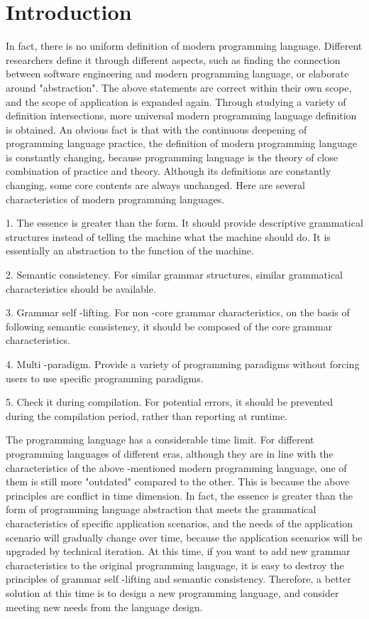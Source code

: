 \section{Introduction}
In fact, there is no uniform definition of modern programming language.
Different researchers define it through different aspects, such as finding
the connection between software engineering and modern programming language,
or elaborate around "abstraction".
The above statements are correct within their own scope, and the scope of
application is expanded again.
Through studying a variety of definition intersections, more universal modern
programming language definition is obtained.
An obvious fact is that with the continuous deepening of programming language practice,
the definition of modern programming language is constantly changing,
because programming language is the theory of close combination of
practice and theory.
Although its definitions are constantly changing,
some core contents are always unchanged.
Here are several characteristics of modern programming languages.


1. The essence is greater than the form. It should provide descriptive grammatical structures instead of telling the machine what the machine should do. It is essentially an abstraction to the function of the machine.

2. Semantic consistency. For similar grammar structures, similar grammatical characteristics should be available.

3. Grammar self -lifting. For non -core grammar characteristics, on the basis of following semantic consistency, it should be composed of the core grammar characteristics.

4. Multi -paradigm. Provide a variety of programming paradigms without forcing users to use specific programming paradigms.

5. Check it during compilation. For potential errors, it should be prevented during the compilation period, rather than reporting at runtime.


The programming language has a considerable time limit. For different programming languages of different eras, although they are in line with the characteristics of the above -mentioned modern programming language, one of them is still more "outdated" compared to the other. This is because the above principles are conflict in time dimension. In fact, the essence is greater than the form of programming language abstraction that meets the grammatical characteristics of specific application scenarios, and the needs of the application scenario will gradually change over time, because the application scenarios will be upgraded by technical iteration. At this time, if you want to add new grammar characteristics to the original programming language, it is easy to destroy the principles of grammar self -lifting and semantic consistency. Therefore, a better solution at this time is to design a new programming language, and consider meeting new needs from the language design.

